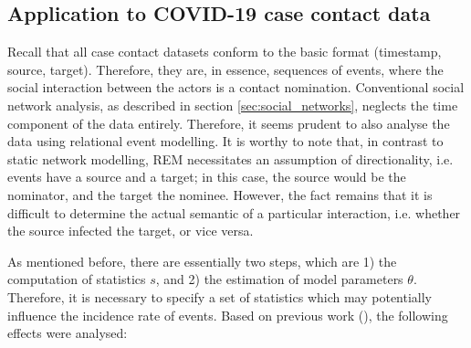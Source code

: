 \subsection{Application to COVID-19 case contact data}
\label{sec:rem_application}

Recall that all case contact datasets conform to the basic format (timestamp, source, target). Therefore, they are, in essence, sequences of events, where the social interaction between the actors is a contact nomination. Conventional social network analysis, as described in section \ref{sec:social_networks}, neglects the time component of the data entirely. Therefore, it seems prudent to also analyse the data using relational event modelling. It is worthy to note that, in contrast to static network modelling, REM necessitates an assumption of directionality, i.e. events have a source and a target; in this case, the source would be the nominator, and the target the nominee. However, the fact remains that it is difficult to determine the actual semantic of a particular interaction, i.e. whether the source infected the target, or vice versa.

As mentioned before, there are essentially two steps, which are 1) the computation of statistics $s$, and 2) the estimation of model parameters $\theta$. Therefore, it is necessary to specify a set of statistics which may potentially influence the incidence rate of events. Based on previous work (\cite{butts20084,brandes2009networks,stadtfeld2017interactions}), the following effects were analysed:

